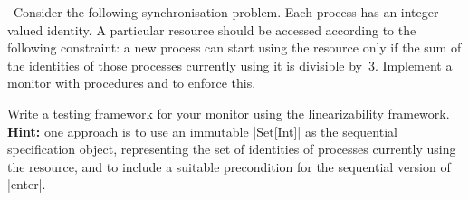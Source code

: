 \begin{question}
\Programming\
Consider the following synchronisation problem.  Each process has an
integer-valued identity.  A particular resource should be accessed according
to the following constraint: a new process can start using the resource only
if the sum of the identities of those processes currently using it is
divisible by~3.  Implement a monitor with procedures  and
\SCALA{exit(id: Int)} to enforce this.  

Write a testing framework for your monitor using the linearizability
framework.  \textbf{Hint:} one approach is to use an immutable |Set[Int]| as
the sequential specification object, representing the set of identities of
processes currently using the resource, and to include a suitable precondition
for the sequential version of |enter|.
\end{question}



